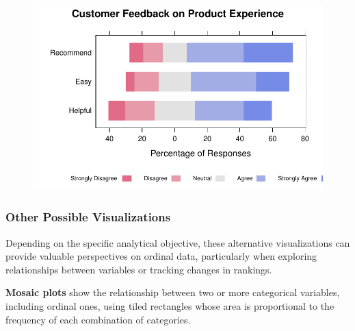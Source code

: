 \documentclass[
  letterpaper,
  DIV=11,
  numbers=noendperiod]{scrartcl}
\begin{document}
\begin{figure}[H]

{\centering \includegraphics{Ordinal_data_an_R_files/figure-pdf/unnamed-chunk-4-1.pdf}

}

\end{figure}

\hypertarget{other-possible-visualizations}{%
\subsubsection*{Other Possible
Visualizations}\label{other-possible-visualizations}}

Depending on the specific analytical objective, these alternative
visualizations can provide valuable perspectives on ordinal data,
particularly when exploring relationships between variables or tracking
changes in rankings.

\textbf{Mosaic plots} show the relationship between two or more
categorical variables, including ordinal ones, using tiled rectangles
whose area is proportional to the frequency of each combination of
categories.
\end{document}
